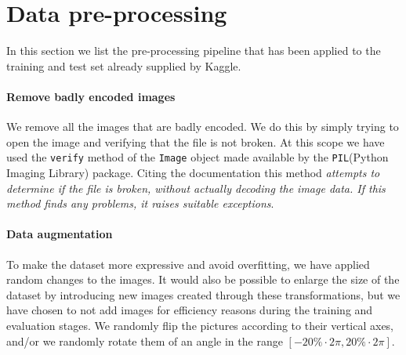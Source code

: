 \section{Data pre-processing}\label{1_preProcessing}
In this section we list the pre-processing pipeline that has been applied to the training and test set already supplied by Kaggle.

\paragraph{Remove badly encoded images}
We remove all the images that are badly encoded. We do this by simply trying to open the image and verifying that the file is not broken. At this scope we have used the \texttt{verify} method of the \texttt{Image} object made available by the \texttt{PIL}(Python Imaging Library) package. Citing the documentation this method \textit{attempts to determine if the file is broken, without actually decoding the image data. If this method finds any problems, it raises suitable exceptions}.

\paragraph{Data augmentation}
To make the dataset more expressive and avoid overfitting, we have applied random changes to the images. It would also be possible to enlarge the size of the dataset by introducing new images created through these transformations, but we have chosen to not add images for efficiency reasons during the training and evaluation stages. We randomly flip the pictures according to their vertical axes, and/or we randomly rotate them of an angle in the range $\left[-20\% \cdot 2\pi, 20\% \cdot 2\pi\right]$.